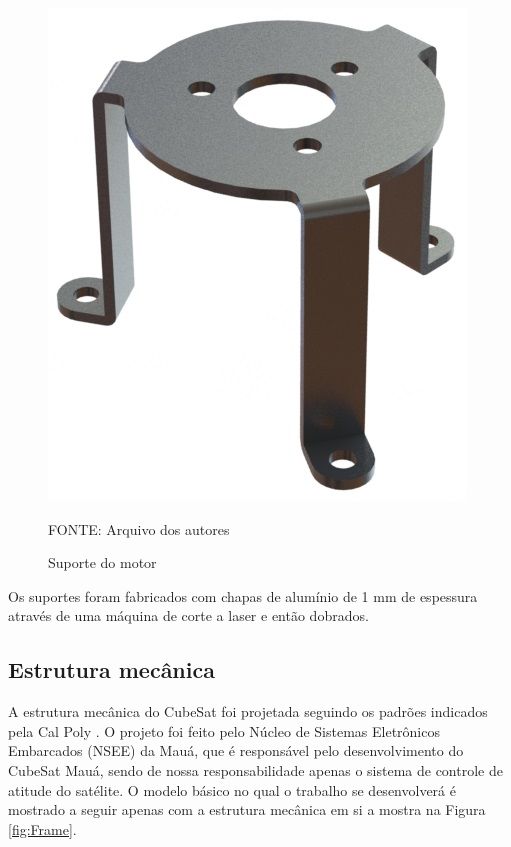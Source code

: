 \documentclass[
	12pt,				%
	openany,			%
	twoside,			%
	a4paper,			%
	english,			%
	french,				%
	spanish,			%
	brazil,				%
	oldfontcommands
	]{abntex2}
\begin{document}
\begin{figure}[th]
	\caption{Suporte do motor}
	\centering
	\includegraphics[width=0.5\linewidth]{./figs/Motor_Sup}
	
	\begin{small}
		FONTE: Arquivo dos autores
	\end{small}
	\label{fig:MS}
\end{figure}

Os suportes foram fabricados com chapas de alumínio de 1 mm de espessura através de uma máquina de corte a laser e então dobrados.

\subsection{Estrutura mecânica}

A estrutura mecânica do CubeSat foi projetada seguindo os padrões indicados pela Cal Poly \cite{CalPoly}. O projeto foi feito pelo Núcleo de Sistemas Eletrônicos Embarcados (NSEE) da Mauá, que é responsável pelo desenvolvimento do CubeSat Mauá, sendo de nossa responsabilidade apenas o sistema de controle de atitude do satélite. O modelo básico no qual o trabalho se desenvolverá é mostrado a seguir apenas com a estrutura mecânica em si a mostra na Figura \ref{fig:Frame}.
\end{document}
